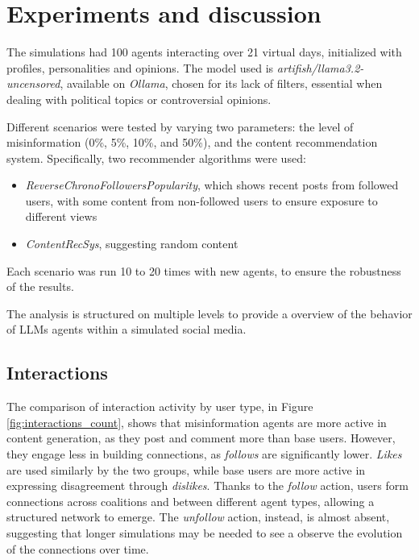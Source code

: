 \section{Experiments and discussion}
\label{sec:experiments}

The simulations had 100 agents interacting over 21 virtual days, initialized with profiles, personalities and opinions.
The model used is \textit{artifish/llama3.2-uncensored}, available on \textit{Ollama}, chosen for its lack of filters, essential when dealing with political topics or controversial opinions.

Different scenarios were tested by varying two parameters: the level of misinformation (0\%, 5\%, 10\%, and 50\%), and the content recommendation system.
Specifically, two recommender algorithms were used:
\begin{itemize}
    \item \textit{ReverseChronoFollowersPopularity}, which shows recent posts from followed users, with some content from non-followed users to ensure exposure to different views
    \item \textit{ContentRecSys}, suggesting random content
\end{itemize}

Each scenario was run 10 to 20 times with new agents, to ensure the robustness of the results.



\medskip
The analysis is structured on multiple levels to provide a overview of the behavior of LLMs agents within a simulated social media.

\subsection{Interactions}

The comparison of interaction activity by user type, in Figure \ref{fig:interactions_count}, shows that misinformation agents are more active in content generation, as they post and comment more than base users. However, they engage less in building connections, as \textit{follows} are significantly lower.
\textit{Likes} are used similarly by the two groups, while base users are more active in expressing disagreement through \textit{dislikes}.
Thanks to the \textit{follow} action, users form connections across coalitions and between different agent types, allowing a structured network to emerge. The \textit{unfollow} action, instead, is almost absent, suggesting that longer simulations may be needed to see a observe the evolution of the connections over time.

